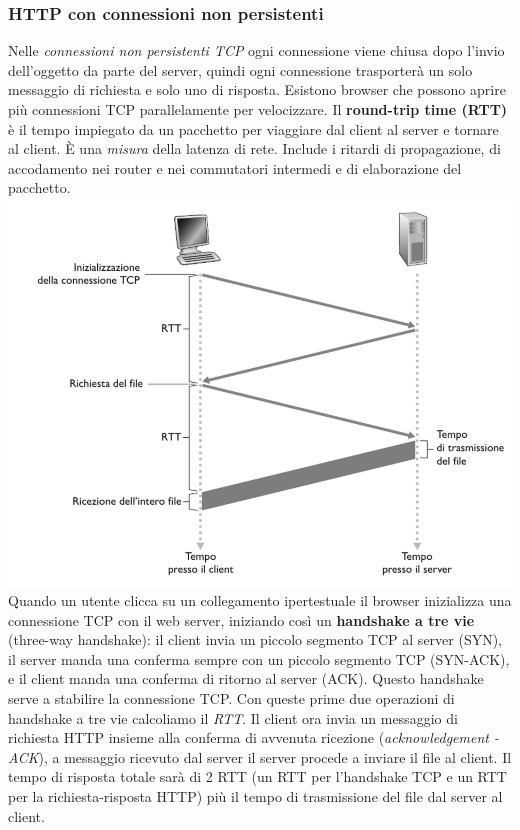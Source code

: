 \subsubsection*{HTTP con connessioni non persistenti}
Nelle \textit{connessioni non persistenti TCP} ogni connessione viene chiusa dopo l'invio dell'oggetto da parte del server, quindi ogni connessione trasporterà un solo messaggio di richiesta e solo uno di risposta.
Esistono browser che possono aprire più connessioni TCP parallelamente per velocizzare.
Il \textbf{round-trip time (RTT)} è il tempo impiegato da un pacchetto per viaggiare dal client al server e tornare al client. È una \textit{misura} della latenza di rete. Include i ritardi di propagazione, di accodamento nei router e nei commutatori intermedi e di elaborazione del pacchetto. \\ 
\includegraphics[width=\textwidth]{./img/rtt.png}
Quando un utente clicca su un collegamento ipertestuale il browser inizializza una connessione TCP con il web server, iniziando così un \textbf{handshake a tre vie} (three-way handshake): il client invia un piccolo segmento TCP al server (SYN), il server manda una conferma sempre con un piccolo segmento TCP (SYN-ACK), e il client manda una conferma di ritorno al server (ACK). Questo handshake serve a stabilire la connessione TCP.
Con queste prime due operazioni di handshake a tre vie calcoliamo il \textit{RTT}.
Il client ora invia un messaggio di richiesta HTTP insieme alla conferma di avvenuta ricezione (\textit{acknowledgement - ACK}), a messaggio ricevuto dal server il server procede a inviare il file al client. Il tempo di risposta totale sarà di 2 RTT (un RTT per l'handshake TCP e un RTT per la richiesta-risposta HTTP) più il tempo di trasmissione del file dal server al client.


